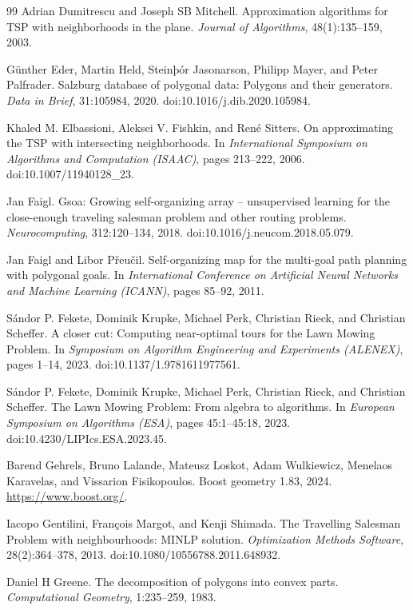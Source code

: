 \documentclass[11pt,a4paper]{article}
\theoremstyle{plain}
\begin{document}
\begin{thebibliography}{99}
 Adrian Dumitrescu and Joseph SB Mitchell. Approximation algorithms for TSP with neighborhoods in the plane. \emph{Journal of Algorithms}, 48(1):135--159, 2003.

 Günther Eder, Martin Held, Steinþór Jasonarson, Philipp Mayer, and Peter Palfrader. Salzburg database of polygonal data: Polygons and their generators. \emph{Data in Brief}, 31:105984, 2020. doi:10.1016/j.dib.2020.105984.

 Khaled M. Elbassioni, Aleksei V. Fishkin, and René Sitters. On approximating the TSP with intersecting neighborhoods. In \emph{International Symposium on Algorithms and Computation (ISAAC)}, pages 213--222, 2006. doi:10.1007/11940128\_23.

 Jan Faigl. Gsoa: Growing self-organizing array -- unsupervised learning for the close-enough traveling salesman problem and other routing problems. \emph{Neurocomputing}, 312:120--134, 2018. doi:10.1016/j.neucom.2018.05.079.

 Jan Faigl and Libor Přeučil. Self-organizing map for the multi-goal path planning with polygonal goals. In \emph{International Conference on Artificial Neural Networks and Machine Learning (ICANN)}, pages 85--92, 2011.

 Sándor P. Fekete, Dominik Krupke, Michael Perk, Christian Rieck, and Christian Scheffer. A closer cut: Computing near-optimal tours for the Lawn Mowing Problem. In \emph{Symposium on Algorithm Engineering and Experiments (ALENEX)}, pages 1--14, 2023. doi:10.1137/1.9781611977561.

 Sándor P. Fekete, Dominik Krupke, Michael Perk, Christian Rieck, and Christian Scheffer. The Lawn Mowing Problem: From algebra to algorithms. In \emph{European Symposium on Algorithms (ESA)}, pages 45:1--45:18, 2023. doi:10.4230/LIPIcs.ESA.2023.45.

 Barend Gehrels, Bruno Lalande, Mateusz Loskot, Adam Wulkiewicz, Menelaos Karavelas, and Vissarion Fisikopoulos. Boost geometry 1.83, 2024. \url{https://www.boost.org/}.

 Iacopo Gentilini, François Margot, and Kenji Shimada. The Travelling Salesman Problem with neighbourhoods: MINLP solution. \emph{Optimization Methods Software}, 28(2):364--378, 2013. doi:10.1080/10556788.2011.648932.

 Daniel H Greene. The decomposition of polygons into convex parts. \emph{Computational Geometry}, 1:235--259, 1983.


\end{thebibliography}
\end{document}
